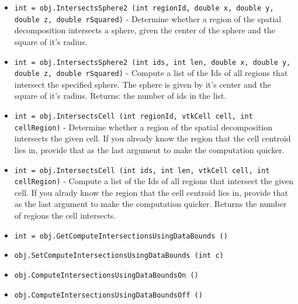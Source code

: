 \begin{itemize}
\item  \verb|int = obj.IntersectsSphere2 (int regionId, double x, double y, double z, double rSquared)| -     Determine whether a region of the spatial decomposition 
    intersects a sphere, given the center of the sphere 
    and the square of it's radius.

\item  \verb|int = obj.IntersectsSphere2 (int ids, int len, double x, double y, double z, double rSquared)| -     Compute a list of the Ids of all regions that 
    intersect the specified sphere.  The sphere is given
    by it's center and the square of it's radius.
    Returns: the number of ids in the list.

\item  \verb|int = obj.IntersectsCell (int regionId, vtkCell cell, int cellRegion)| -     Determine whether a region of the spatial decomposition
    intersects the given cell.  If you already
    know the region that the cell centroid lies in, provide 
    that as the last argument to make the computation quicker.

\item  \verb|int = obj.IntersectsCell (int ids, int len, vtkCell cell, int cellRegion)| -     Compute a list of the Ids of all regions that
    intersect the given cell.  If you alrady
    know the region that the cell centroid lies in, provide
    that as the last argument to make the computation quicker.
    Returns the number of regions the cell intersects.

\item  \verb|int = obj.GetComputeIntersectionsUsingDataBounds ()|

\item  \verb|obj.SetComputeIntersectionsUsingDataBounds (int c)|

\item  \verb|obj.ComputeIntersectionsUsingDataBoundsOn ()|

\item  \verb|obj.ComputeIntersectionsUsingDataBoundsOff ()|

\end{itemize}
